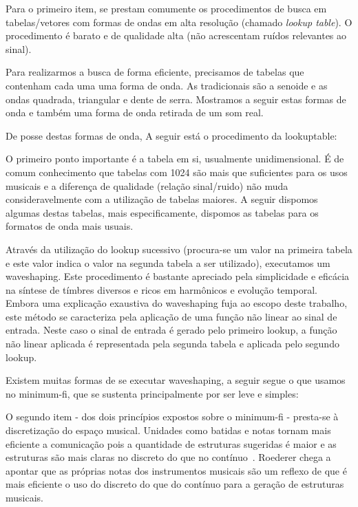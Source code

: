 Para o primeiro item, se prestam comumente os procedimentos de busca em tabelas/vetores com formas
de ondas em alta resolução (chamado \emph{lookup table}). O procedimento é barato e de qualidade alta
(não acrescentam ruídos relevantes ao sinal).

Para realizarmos a busca de forma eficiente, precisamos de tabelas que contenham cada uma
uma forma de onda. As tradicionais são a senoide e as ondas quadrada, triangular e dente de serra.
Mostramos a seguir estas formas de onda e também uma forma de onda retirada de um som real.

De posse destas formas de onda, A seguir está o procedimento da lookuptable:


O primeiro ponto importante é a tabela em si, usualmente unidimensional. É de comum conhecimento que
tabelas com 1024 são mais que suficientes para os usos musicais e a diferença
de qualidade (relação sinal/ruido) não muda consideravelmente com a utilização
de tabelas maiores. A seguir dispomos algumas destas tabelas, mais 
especificamente, dispomos as tabelas para os formatos de onda mais usuais. 


Através da utilização do lookup sucessivo (procura-se um valor na primeira tabela
e este valor indica o valor na segunda tabela a ser utilizado), executamos
um waveshaping. Este procedimento é bastante apreciado pela simplicidade e eficácia
na síntese de tímbres diversos e ricos em harmônicos e evolução temporal. Embora
uma explicação exaustiva do waveshaping fuja ao escopo deste trabalho, este
método se caracteriza pela aplicação de uma função não linear ao sinal de entrada.
Neste caso o sinal de entrada é gerado pelo primeiro lookup, a função não linear aplicada
é representada pela segunda tabela e aplicada pelo segundo lookup.

Existem muitas formas de se executar waveshaping, a seguir segue o que usamos no minimum-fi, que se sustenta principalmente por ser leve e simples:


O segundo item - dos dois princípios expostos sobre o minimum-fi - presta-se à discretização do espaço musical. Unidades como batidas e notas
tornam mais eficiente a comunicação pois a quantidade
de estruturas sugeridas é maior e as estruturas são mais claras no discreto do que no contínuo~\cite{Roederer}. Roederer chega a
apontar que as próprias notas dos instrumentos musicais são um reflexo de que é mais eficiente
o uso do discreto do que do contínuo para a geração de estruturas musicais.

